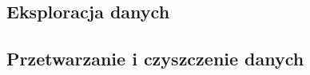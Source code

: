 \documentclass[12pt, a4paper]{article}
\begin{document}








\subsection{Eksploracja danych}


\subsection{Przetwarzanie i czyszczenie danych}
\end{document}
